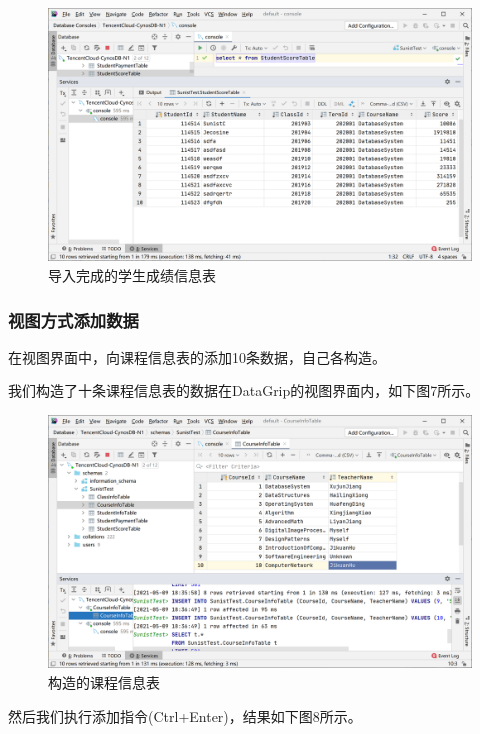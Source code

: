 \documentclass[a4paper,UTF8,heading=false,12pt]{article}
\begin{document}
\begin{figure}[htbp]
    \centering
    \includegraphics[width=15cm]{../Images/StudentScoreTable_OnImported.png}
    \caption{导入完成的学生成绩信息表}
\end{figure}

\newpage

\subsubsection{视图方式添加数据}

在视图界面中，向课程信息表的添加10条数据，自己各构造。

我们构造了十条课程信息表的数据在DataGrip的视图界面内，如下图7所示。

\begin{figure}[htbp]
    \centering
    \includegraphics[width=14cm]{../Images/CourseInfoTable_OnImport.png}
    \caption{构造的课程信息表}
\end{figure}

然后我们执行添加指令(Ctrl+Enter)，结果如下图8所示。
\end{document}
